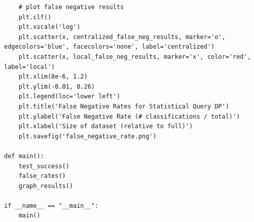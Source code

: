 \documentclass[12pt]{article}
\begin{document}
\begin{appendices}
\begin{lstlisting}
    # plot false negative results
    plt.clf()
    plt.xscale('log')
    plt.scatter(x, centralized_false_neg_results, marker='o', edgecolors='blue', facecolors='none', label='centralized')
    plt.scatter(x, local_false_neg_results, marker='x', color='red', label='local')
    plt.xlim(8e-6, 1.2)
    plt.ylim(-0.01, 0.26)
    plt.legend(loc='lower left')
    plt.title('False Negative Rates for Statistical Query DP')
    plt.ylabel('False Negative Rate (# classifications / total)')
    plt.xlabel('Size of dataset (relative to full)')
    plt.savefig('false_negative_rate.png')

def main():
    test_success()
    false_rates()
    graph_results()

if __name__ == "__main__":
    main()
\end{lstlisting}

\end{appendices}
\end{document}
